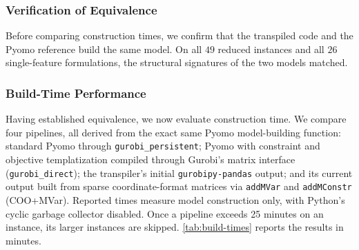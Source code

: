 \documentclass[runningheads]{llncs}
\begin{document}
\subsubsection{Verification of Equivalence}
\label{sec:results-verify}

Before comparing construction times, we confirm that the transpiled code and the Pyomo reference build the same model. On all $49$ reduced instances and all $26$ single-feature formulations, the structural signatures of the two models matched. 

\subsubsection{Build-Time Performance}
\label{sec:results-timing}

Having established equivalence, we now evaluate construction time. We compare four pipelines, all derived from the exact same Pyomo model-building function: standard Pyomo through \texttt{gurobi\_persistent}; Pyomo with constraint and objective templatization compiled through Gurobi's matrix interface (\texttt{gurobi\_direct}); the transpiler's initial \texttt{gurobipy-pandas} output; and its current output built from sparse coordinate-format matrices via \texttt{addMVar} and \texttt{addMConstr} (COO+MVar). Reported times measure model construction only, with Python's cyclic garbage collector disabled. Once a pipeline exceeds 25 minutes on an instance, its larger instances are skipped. \autoref{tab:build-times} reports the results in minutes.
\end{document}

